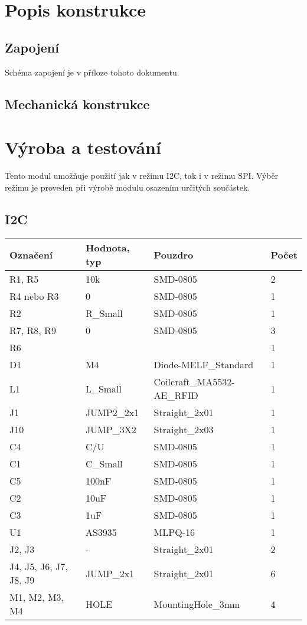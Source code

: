 \documentclass[12pt,a4paper,final,titlepage,twoside]{article}
\begin{document}



\section{Popis konstrukce}

\subsection{Zapojení}
Schéma zapojení je v příloze tohoto dokumentu.

\subsection{Mechanická konstrukce}

\section{Výroba a testování}

Tento modul umožňuje použití jak v režimu I2C, tak i v režimu SPI. Výběr režimu je proveden při výrobě modulu osazením určitých součástek.

\subsection{I2C}

\begin{center}
  \begin{tabular}{ | l | l | l | l |}
    \hline
    Označení & Hodnota, typ & Pouzdro & Počet \\ \hline
    \hline
			R1, R5 & 10k & SMD-0805 & 2\\ \hline
			R4 nebo R3 & 0 & SMD-0805 & 1\\ \hline
			R2 & R\_Small & SMD-0805 & 1\\ \hline
			R7, R8, R9 & 0 & SMD-0805 & 3\\ \hline
			R6 &  &  & 1\\ \hline
			D1 & M4 & Diode-MELF\_Standard & 1\\ \hline
			L1 & L\_Small & Coilcraft\_MA5532-AE\_RFID & 1\\ \hline
			J1 & JUMP2\_2x1 & Straight\_2x01 & 1\\ \hline
			J10 & JUMP\_3X2 & Straight\_2x03 & 1\\ \hline
			C4 & C/U & SMD-0805 & 1\\ \hline
			C1 & C\_Small & SMD-0805 & 1\\ \hline
			C5 & 100nF & SMD-0805 & 1\\ \hline
			C2 & 10uF & SMD-0805 & 1\\ \hline
			C3 & 1uF & SMD-0805 & 1\\ \hline
			U1 & AS3935 & MLPQ-16 & 1\\ \hline
			J2, J3 & - & Straight\_2x01 & 2\\ \hline
			J4, J5, J6, J7, J8, J9 & JUMP\_2x1 & Straight\_2x01 & 6\\ \hline
			M1, M2, M3, M4 & HOLE & MountingHole\_3mm & 4\\ \hline
	
  \end{tabular}
\end{center}
\end{document}
